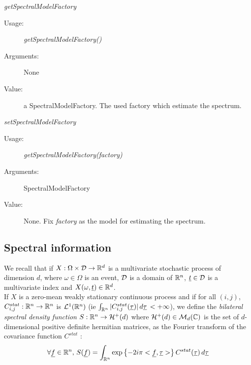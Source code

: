 \begin{description}
\begin{description}
\item \textit{getSpectralModelFactory}
\begin{description}
\item[Usage:] \textit{getSpectralModelFactory()}
\item[Arguments:] None
\item[Value:]   a SpectralModelFactory. The used factory which estimate the spectrum.
\end{description}
\bigskip

\item \textit{setSpectralModelFactory}
\begin{description}
\item[Usage:] \textit{getSpectralModelFactory(factory)}
\item[Arguments:] SpectralModelFactory
\item[Value:]   None. Fix \textit{factory} as the model for estimating the spectrum.
\end{description}
\bigskip


\end{description}


\end{description}
\newpage
\subsection{Spectral information}

We recall that if $X: \Omega \times{\mathcal D} \rightarrow {\mathbb R}^d$ is a multivariate stochastic process of dimension $d$, where $\omega \in \Omega$ is an event, ${\mathcal D}$ is a domain of ${\mathbb R}^n$, ${\underline{t}}\in {\mathcal D}$ is a multivariate index and $X(\omega, {\underline{t}}) \in {\mathbb R}^d$.\\

If $X$  is a zero-mean weakly stationary continuous process and if for all $(i,j)$, $C^{stat}_{i,j}: {\mathbb R}^n \rightarrow {\mathbb R}^n$ is ${\mathcal L}^1({\mathbb R}^n)$ (ie $\int_{{\mathbb R}^n} |C^{stat}_{i,j}({\underline{\tau}})|\, d{\underline{\tau}}\, < +\infty$),  we  define the \emph{ bilateral spectral density function} $S : {\mathbb R}^n \rightarrow {\mathcal H}^+(d)$ where $\mathcal{H}^+(d) \in \mathcal{M}_d({\mathbb C})$ is the set of $d$-dimensional positive definite hermitian matrices, as the Fourier transform of the covariance function $C^{stat}$ :
\begin{equation} \label{specdensFunc}
\forall {\underline{f}} \in {\mathbb R}^n, \,S({\underline{f}}) = \int_{{\mathbb R}^n}\exp\left\{  -2i\pi <{\underline{f}},{\underline{\tau}}> \right\} C^{stat}({\underline{\tau}})\, d{\underline{\tau}}
\end{equation}

